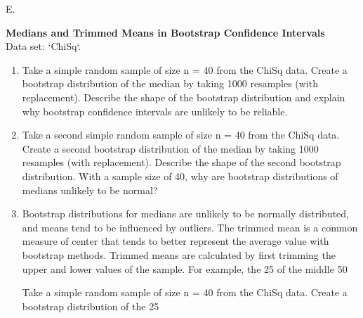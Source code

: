\documentclass[
]{report}
\newcounter{excount}
\renewcommand{\theexcount}{E\arabic{excount}}
\begin{document}
\begin{list}{\theexcount.}{ \setlength{\itemsep}{0.5em}}
  
  
  
  
  \item \textbf{Medians and Trimmed Means in Bootstrap Confidence Intervals} \\
  Data set: `ChiSq`. 
  \begin{enumerate}
    \setcounter{enumi}{0}  
    \item Take a simple random sample of size n = 40 from the ChiSq data. Create a bootstrap distribution of the median by taking 1000 resamples (with replacement). Describe the shape of the bootstrap distribution and explain why bootstrap confidence intervals are unlikely to be reliable.
    \item Take a second simple random sample of size n = 40 from the ChiSq data. Create a second bootstrap distribution of the median by taking 1000 resamples (with replacement). Describe the shape of the second bootstrap distribution. With a sample size of 40, why are bootstrap distributions of medians unlikely to be normal?
    \item Bootstrap distributions for medians are unlikely to be normally distributed, and means tend to be influenced by outliers. The trimmed mean is a common measure of center that tends to better represent the average value with bootstrap methods. Trimmed means are calculated by first trimming the upper and lower values of the sample. For example, the 25%
of the middle 50%

Take a simple random sample of size n = 40 from the ChiSq data. Create a bootstrap distribution of the 25%
  \end{enumerate}
  
  
  
  
  

\end{list}
\end{document}
